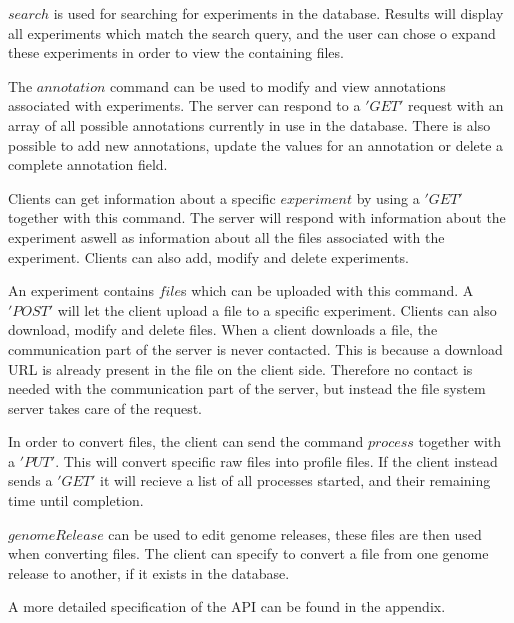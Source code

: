$search$ is used for searching for experiments in the database. Results will display all experiments which match the search query, and the user can chose o expand these experiments in order to view the containing files.

The $annotation$ command can be used to modify and view annotations associated with experiments. The server can respond to a $'GET'$ request with an array of all possible annotations currently in use in the database. There is also possible to add new annotations, update the values for an annotation or delete a complete annotation field.

Clients can get information about a specific $experiment$ by using a $'GET'$ together with this command. The server will respond with information about the experiment aswell as information about all the files associated with the experiment. Clients can also add, modify and delete experiments.

An experiment contains $file$s which can be uploaded with this command. A $'POST'$ will let the client upload a file to a specific experiment. Clients can also download, modify and delete files. When a client downloads a file, the communication part of the server is never contacted. This is because a download URL is already present in the file on the client side. Therefore no contact is needed with the communication part of the server, but instead the file system server takes care of the request.

In order to convert files, the client can send the command $process$ together with a $'PUT'$. This will convert specific raw files into profile files. If the client instead sends a $'GET'$ it will recieve a list of all processes started, and their remaining time until completion.

$genomeRelease$ can be used to edit genome releases, these files are then used when converting files. The client can specify to convert a file from one genome release to another, if it exists in the database.

A more detailed specification of the API can be found in the appendix.
